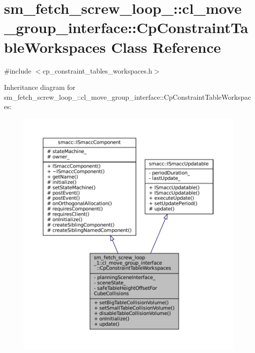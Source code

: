 \hypertarget{classsm__fetch__screw__loop__1_1_1cl__move__group__interface_1_1CpConstraintTableWorkspaces}{}\section{sm\+\_\+fetch\+\_\+screw\+\_\+loop\+\_\+:\+:cl\+\_\+move\+\_\+group\+\_\+interface\+:\+:Cp\+Constraint\+Table\+Workspaces Class Reference}
\label{classsm__fetch__screw__loop__1_1_1cl__move__group__interface_1_1CpConstraintTableWorkspaces}


{\ttfamily \#include $<$cp\+\_\+constraint\+\_\+tables\+\_\+workspaces.\+h$>$}



Inheritance diagram for sm\+\_\+fetch\+\_\+screw\+\_\+loop\+\_\+:\+:cl\+\_\+move\+\_\+group\+\_\+interface\+:\+:Cp\+Constraint\+Table\+Workspaces\+:
\nopagebreak
\begin{figure}[H]
\begin{center}
\leavevmode
\includegraphics[width=350pt]{classsm__fetch__screw__loop__1_1_1cl__move__group__interface_1_1CpConstraintTableWorkspaces__inherit__graph}
\end{center}
\end{figure}


